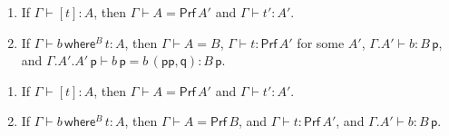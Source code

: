 \documentclass{LMCS}
\theoremstyle{plain}\newtheorem{satz}[thm]{Satz}
\newcommand{\ctxe}[2]{#1.#2}
\newcommand{\idsubs}[1]{\mathsf{id}_{#1}}
\newcommand{\exsubs}[2]{( #1, #2)}
\newcommand{\subsTm}[2]{#1\,#2}
\newcommand{\subsTy}[2]{#1\,#2}
\newcommand{\p}{\mathsf{p}}
\newcommand{\q}{\mathsf{q}}
\newcommand{\boxty}[1]{[#1]}
\newcommand{\boxtm}[1]{[#1]}
\newcommand{\subid}[2]{\exsubs{\idsubs{#1}}{#2}}
\newcommand{\dtype}[2]{#1\vdash#2}
\newcommand{\dterm}[3]{#1\vdash#3:#2}
\newcommand{\deqtype}[3]{#1\vdash#2=#3}
\newcommand{\deqterm}[4]{#1\vdash#3=#4:#2}
\renewcommand{\boxty}[1]{\mathsf{Prf}\,#1}
\newcommand{\whereraw}{\mathsf{where}}
\newcommand{\wheretm}[3]{#1\,\whereraw\!^{#3}\,#2}
\newcommand{\enum}[1]{\mathsf{N}_{#1}}
\newcommand{\constn}[1]{\mathsf{c}_{#1}}
\begin{document}
{\begin{lem}
\begin{enumerate}[\em\phantom0(1)]
      $\dtype{\ctxe{\Gamma}{\enum{n}}}{B} $,
      $\dterm{\Gamma}{\subsTy{B}{\subid{}{\constn{i}}}}{t_i}$,
       $\dterm{\Gamma}{\enum{n}}{t'}$, and
      $\deqtype{\Gamma}{A}{\subsTy{B}{\subid{}{t}}}$.  
  \item If $\dterm{\Gamma}{A}{\boxtm{t}}$, then
    $\deqtype{\Gamma}{A}{\boxty{A'}}$ and
    $\dterm{\Gamma}{A'}{t'}$.
  \item If $\dterm{\Gamma}{A}{\wheretm{b}{t}{B}}$, then
    $\deqtype{\Gamma}{A}{B}$, 
    $\dterm{\Gamma}{\boxty{A'}}{t}$ for some $A'$, 
    $\dterm{\ctxe{\Gamma}{A'}}{\subsTy{B}{\p}}{b}$, and
    $\deqterm{\ctxe{\ctxe{\Gamma}{A'}}{\subsTy{A'}{\p}}}
    {\subsTy{B}{\p}}{\subsTm{b}{\p}}{\subsTm{b}{\exsubs{\p\p}{\q}}}$.
    \end{enumerate}
  \end{lem}

} {
\begin{lem}[Inversion]\hfill
  \label{lem:inv-pi} 
  \begin{enumerate}[\em(1)]

  \item If $\dterm{\Gamma}{A}{\boxtm{t}}$, then
    $\deqtype{\Gamma}{A}{\boxty{A'}}$ and
    $\dterm{\Gamma}{A'}{t'}$.


  \item If $\dterm{\Gamma}{A}{\wheretm{b}{t}{B}}$, then
    $\deqtype{\Gamma}{A}{\boxty{B}}$, and
    $\dterm{\Gamma}{\boxty{A'}}{t}$, and
    $\dterm{\ctxe{\Gamma}{A'}}{\subsTy{B}{\p}}{b}$.
    \end{enumerate}
  \end{lem}
}
\end{document}
